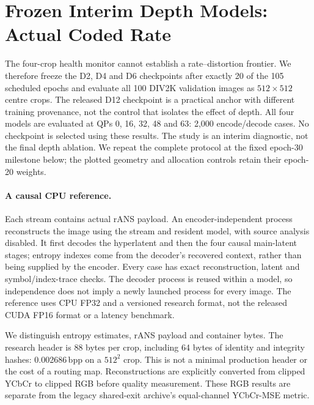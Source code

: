 \section{Frozen Interim Depth Models: Actual Coded Rate}
\label{sec:interimdepth}

The four-crop health monitor cannot establish a rate--distortion frontier.
We therefore freeze the D2, D4 and D6 checkpoints after exactly 20 of the
105 scheduled epochs and evaluate all 100 DIV2K validation images as
$512\times512$ centre crops. The released D12 checkpoint is a practical
anchor with different training provenance, not the control that isolates
the effect of depth. All four models are evaluated at QPs 0, 16, 32, 48
and 63: 2,000 encode/decode cases. No checkpoint is selected using these
results. The study is an interim diagnostic, not the final depth ablation.
We repeat the complete protocol at the fixed epoch-30 milestone below;
the plotted geometry and allocation controls retain their epoch-20 weights.

\paragraph{A causal CPU reference.}
Each stream contains actual rANS payload. An encoder-independent process
reconstructs the image using the stream and resident model, with source
analysis disabled. It first decodes the hyperlatent and then the four
causal main-latent stages; entropy indexes come from the decoder's recovered
context, rather than being supplied by the encoder. Every case has exact
reconstruction, latent and symbol/index-trace checks. The decoder process
is reused within a model, so independence does not imply a newly launched
process for every image. The reference uses CPU FP32 and a versioned
research format, not the released CUDA FP16 format or a latency benchmark.

We distinguish entropy estimates, rANS payload and container bytes.
The research header is 88 bytes per crop, including 64 bytes of identity
and integrity hashes: 0.002686\,bpp on a $512^2$ crop. This is not a
minimal production header or the cost of a routing map. Reconstructions
are explicitly converted from clipped YCbCr to clipped RGB before quality
measurement. These RGB results are separate from the legacy shared-exit
archive's equal-channel YCbCr-MSE metric.

